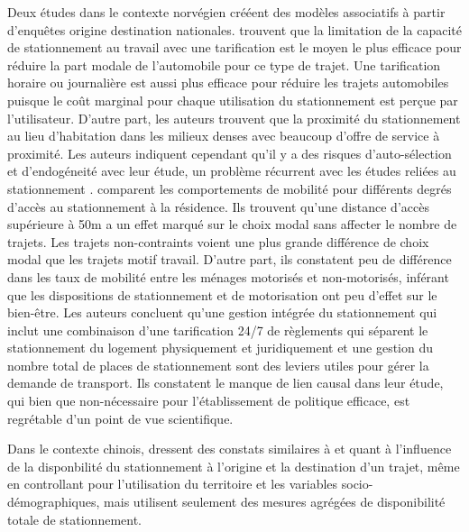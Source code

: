 Deux études dans le contexte norvégien \parencite{Christiansen:ParkingFacilities:2017,Christiansen:HouseholdParking:2017} crééent des modèles associatifs à partir d'enquêtes origine destination nationales. \textcite{Christiansen:ParkingFacilities:2017} trouvent que la limitation de la capacité de stationnement au travail avec une tarification est le moyen le plus efficace pour réduire la part modale de l'automobile pour ce type de trajet. Une tarification horaire ou journalière est aussi plus efficace pour réduire les trajets automobiles puisque le coût marginal pour chaque utilisation du stationnement est perçue par l'utilisateur. D'autre part, les auteurs trouvent que la proximité du stationnement au lieu d'habitation dans les milieux denses avec beaucoup d'offre de service à proximité. Les auteurs indiquent cependant qu'il y a des risques d'auto-sélection et d'endogéneité avec leur étude, un problème récurrent avec les études reliées au stationnement \parencite{Inci:ReviewEconomics:2015}. \textcite{Christiansen:HouseholdParking:2017} comparent les comportements de mobilité pour différents degrés d'accès au stationnement à la résidence. Ils trouvent qu'une distance d'accès supérieure à 50m a un effet marqué sur le choix modal sans affecter le nombre de trajets. Les trajets non-contraints voient une plus grande différence de choix modal que les trajets motif travail. D'autre part, ils constatent peu de différence dans les taux de mobilité entre les ménages motorisés et non-motorisés, inférant que les dispositions de stationnement et de motorisation ont peu d'effet sur le bien-être. Les auteurs concluent qu'une gestion intégrée du stationnement qui inclut une combinaison d'une tarification 24/7 de règlements qui séparent le stationnement du logement physiquement et juridiquement et une gestion du nombre total de places de stationnement sont des leviers utiles pour gérer la demande de transport. Ils constatent le manque de lien causal dans leur étude, qui bien que non-nécessaire pour l'établissement de politique efficace, est regrétable d'un point de vue scientifique.\par 
Dans le contexte chinois, \textcite{Yin:BuiltEnvironment:2018} dressent des constats similaires à \textcite{Christiansen:HouseholdParking:2017} et \textcite{Christiansen:ParkingFacilities:2017} quant à l'influence de la disponbilité du stationnement à l'origine et la destination d'un trajet, même en controllant pour l'utilisation du territoire et les variables socio-démographiques, mais utilisent seulement des mesures agrégées de disponibilité totale de stationnement.\par
